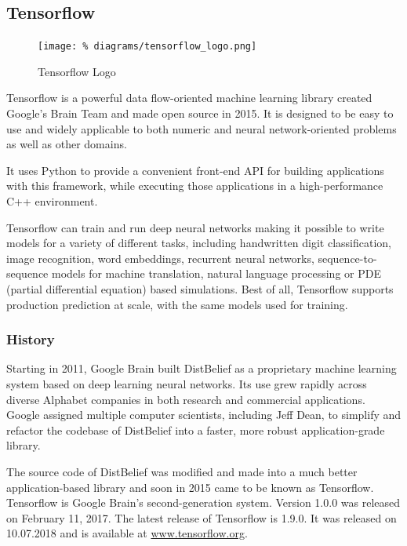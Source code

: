 \subsection{Tensorflow}

\begin{figure}[H]
  \centering
  \texttt{[image: \%
    diagrams/tensorflow\_logo.png]}
  \caption{Tensorflow Logo}
\end{figure}

Tensorflow is a powerful data flow-oriented machine
learning library created Google's Brain Team and made open
source in 2015. It is designed to be easy to use and widely
applicable to both numeric and neural network-oriented
problems as well as other domains.\cite{david3}

It uses Python to provide a convenient front-end API for
building applications with this framework, while executing
those applications in a high-performance C++ environment.

Tensorflow can train and run deep neural networks making it
possible to write models for a variety of different tasks,
including handwritten digit classification, image
recognition, word embeddings, recurrent neural networks,
sequence-to-sequence models for machine translation,
natural language processing or PDE (partial differential
equation) based simulations. Best of all, Tensorflow
supports production prediction at scale, with the same
models used for training.\cite{david5}

\subsubsection{History}

Starting in 2011, Google Brain built DistBelief as a
proprietary machine learning system based on deep learning
neural networks. Its use grew rapidly across diverse
Alphabet companies in both research and commercial
applications. Google assigned multiple computer scientists,
including Jeff Dean, to simplify and refactor the codebase
of DistBelief into a faster, more robust application-grade
library.\cite{david7}

The source code of DistBelief was modified and made into a
much better application-based library and soon in 2015 came
to be known as Tensorflow. Tensorflow is Google Brain's
second-generation system. Version 1.0.0 was released on
February 11, 2017.\cite{david3} The latest release of
Tensorflow is 1.9.0. It was released on 10.07.2018 and is
available at \url{www.tensorflow.org}.

